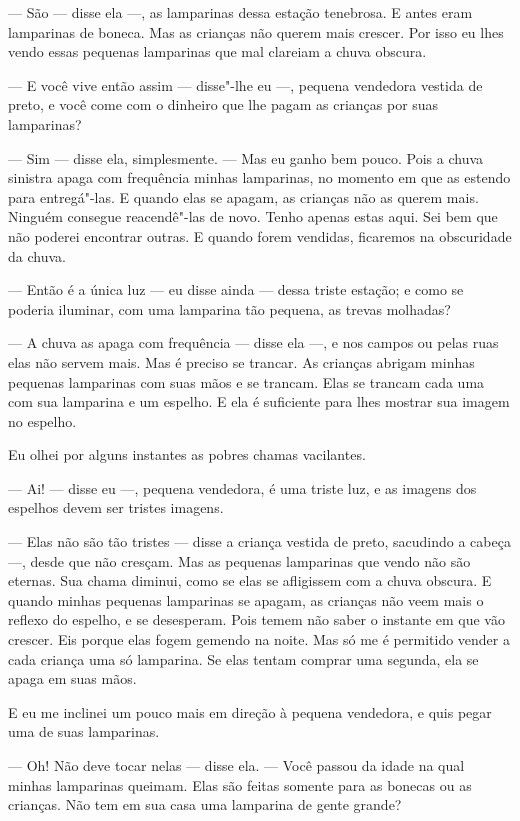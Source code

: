 --- São --- disse ela ---, as lamparinas dessa estação tenebrosa. E antes eram
lamparinas de boneca. Mas as crianças não querem mais crescer. Por isso eu
lhes vendo essas pequenas lamparinas que mal clareiam a chuva obscura.

--- E você vive então assim --- disse"-lhe eu ---, pequena vendedora vestida de
preto, e você come com o dinheiro que lhe pagam as crianças por suas
lamparinas?

--- Sim --- disse ela, simplesmente. --- Mas eu ganho bem pouco. Pois a chuva
sinistra apaga com frequência minhas lamparinas, no momento em que as
estendo para entregá"-las. E quando elas se apagam, as crianças não as
querem mais. Ninguém consegue reacendê"-las de novo. Tenho apenas estas
aqui. Sei bem que não poderei encontrar outras. E quando forem vendidas,
ficaremos na obscuridade da chuva.

--- Então é a única luz --- eu disse ainda --- dessa triste estação; e como se
poderia iluminar, com uma lamparina tão pequena, as trevas molhadas?

--- A chuva as apaga com frequência --- disse ela ---, e nos campos ou pelas
ruas elas não servem mais. Mas é preciso se trancar. As crianças abrigam
minhas pequenas lamparinas com suas mãos e se trancam. Elas se trancam cada
uma com sua lamparina e um \mbox{espelho.} E ela é suficiente para lhes mostrar sua
imagem no espelho.

Eu olhei por alguns instantes as pobres chamas vacilantes.

--- Ai! --- disse eu ---, pequena vendedora, é uma triste luz, e as imagens dos
espelhos devem ser tristes imagens.

--- Elas não são tão tristes --- disse a criança vestida de preto, sacudindo a
cabeça ---,  desde que não cresçam. Mas as pequenas lamparinas que vendo não são
eternas. Sua chama diminui, como se elas se afligissem com a chuva
obscura. E quando minhas pequenas lamparinas se apagam, as crianças não veem
mais o reflexo do espelho, e se desesperam. Pois temem não saber o
instante em que vão crescer. Eis porque elas fogem gemendo na noite. Mas
só me é permitido vender a cada criança uma só lamparina. Se elas tentam
comprar uma segunda, ela se apaga em suas mãos.

E eu me inclinei um pouco mais em direção à pequena vendedora, e quis
pegar uma de suas lamparinas.

--- Oh! Não deve tocar nelas --- disse ela.  --- Você passou da idade na qual
minhas lamparinas queimam. Elas são feitas somente para as bonecas ou as
crianças. Não tem em sua casa uma lamparina de gente grande?

